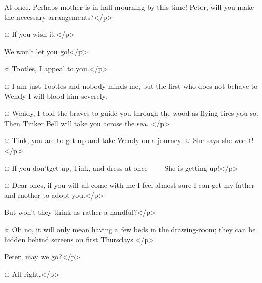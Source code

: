 \begin{drama}
\wendyspeaks
At once.
Perhaps mother is in half-mourning by this time!
Peter, will you make the necessary arrangements?</p>


\peterspeaks {}¤
If you wish it.</p>


\curlyspeaks
We won't let you go!</p>

\wendyspeaks {}¤
Tootles, I appeal to you.</p>

\tootlesspeaks {}¤
I am just Tootles and nobody minds me, but the first who does not behave to Wendy I will blood him severely.

\peterspeaks {}¤
Wendy, I told the braves to guide you through the wood as flying tires you so.
Then Tinker Bell will take you across the sea.
</p>

\nibsspeaks {}¤
Tink, you are to get up and take Wendy on a journey.
¤
She says she won't!</p>

\peterspeaks {}¤
If you don'tget up, Tink, and dress at once—— She is getting up!</p>

\wendyspeaks {}¤
Dear ones, if you will all come with me I feel almost sure I can get my father and mother to adopt you.</p>


\nibsspeaks
But won't they think us rather a handful?</p>

\wendyspeaks {}¤
Oh no, it will only mean having a few beds in the drawing-room; they can be hidden behind screens on first Thursdays.</p>


Peter, may we go?</p>

\peterspeaks {}¤
All right.</p>


\end{drama}
